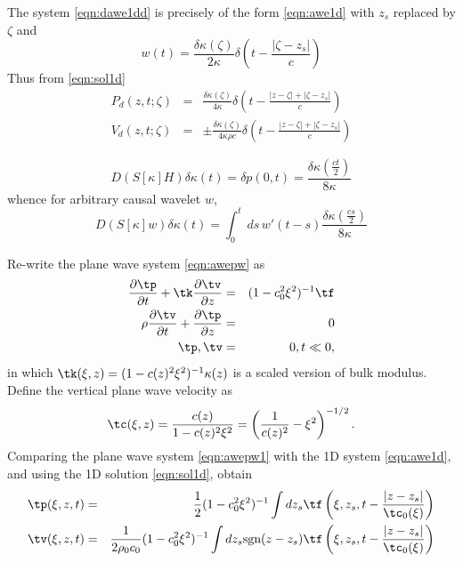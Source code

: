 The system \ref{eqn:dawe1dd} is precisely of the form
\ref{eqn:awe1d} with $z_s$ replaced by $\zeta$ and
\[
  w(t)= \frac{\delta\kappa(\zeta)}{2\kappa}\delta\left(t - \frac{|\zeta-z_s|}{c}\right)
\]
Thus from \ref{eqn:sol1d}
\begin{eqnarray*}
  P_d(z,t;\zeta) &=& \frac{\delta\kappa(\zeta)}{4\kappa} \delta\left(t - \frac{|z-\zeta|+|\zeta-z_s|}{c}\right) \nonumber \\
  V_d(z,t;\zeta) &=& \pm\frac{\delta\kappa(\zeta)}{4\kappa \rho c} \delta\left(t - \frac{|z-\zeta|+|\zeta-z_s|}{c}\right) 
\end{eqnarray*}

\begin{equation}
\label{eqn:imp1d}
D(S[\kappa]H)\delta \kappa (t) = \delta p(0,t)=  \frac{\delta 
  \kappa\left(\frac{ct}{2}\right)}{8\kappa} 
\end{equation}
whence for arbitrary causal wavelet $w$,
\begin{equation}
\label{eqn:fwd1d}
D(S[\kappa]w)\delta \kappa (t) = \int_0^t\,ds\,w'(t-s)\frac{\delta 
  \kappa\left(\frac{cs}{2}\right)}{8\kappa} 
\end{equation}

Re-write the plane wave system \ref{eqn:awepw} as
\begin{eqnarray}
\label{eqn:awepw1}
\frac{\partial \tp}{\partial t} + \tk\frac{\partial
  \tv}{\partial z} &=& (1-c_0^2\xi^2)^{-1}\tf \nonumber\\
\rho \frac{\partial \tv}{\partial t} + \frac{\partial \tp}{\partial
  z}&=&0\nonumber\\
\tp,\tv&=&0, t \ll 0,
\end{eqnarray}
in which $\tk(\xi,z)=(1-c(z)^2\xi^2)^{-1}\kappa(z)$ is a scaled version of
bulk modulus. Define the vertical plane wave velocity as
\[
\tc(\xi,z)=\frac{c(z)}{1-c(z)^2\xi^2} =
\left(\frac{1}{c(z)^2}-\xi^2\right)^{-1/2}.
\]
Comparing the plane wave system \ref{eqn:awepw1} with the 1D system
\ref{eqn:awe1d}, and using the 1D solution \ref{eqn:sol1d}, obtain
\begin{eqnarray}
\label{eqn:solpw}
\tp(\xi,z,t) &=& \frac{1}{2}(1-c_0^2\xi^2)^{-1}\int dz_s \tf\left(\xi,z_s,t - \frac{|z-z_s|}{\tc_0(\xi)}\right) \nonumber \\
\tv(\xi,z,t) &=& \frac{1}{2\rho_0 c_0}(1-c_0^2\xi^2)^{-1} \int dz_s \mbox{sgn} (z-z_s)\tf\left(\xi,z_s,t - \frac{|z-z_s|}{\tc_0(\xi)}\right)
           \nonumber \\
\end{eqnarray}

